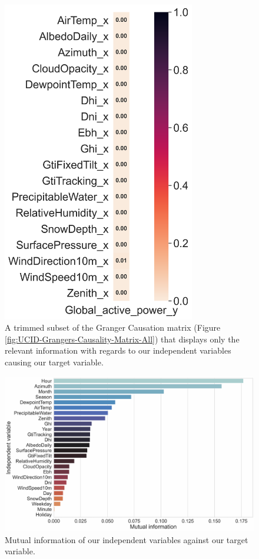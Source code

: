 \begin{figure}[hbt!]
    \centering
    \includegraphics[width=0.75\textwidth]{Images/Chapter 4/UCID/UCID-Grangers-Causality-Matrix-Single.png}
    \caption{A trimmed subset of the Granger Causation matrix (Figure \ref{fig:UCID-Grangers-Causality-Matrix-All}) that displays only the relevant information with regards to our independent variables causing our target variable.}
    \label{fig:UCID-Grangers-Causality-Matrix-Single}
\end{figure}

\begin{figure}[hbt!]
    \centering
    \includegraphics[width=\textwidth]{Images/Chapter 4/UCID/UCID-Mutual-Information.pdf}
    \caption{Mutual information of our independent variables against our target variable.}
    \label{fig:UCID-Mutual-Information-Gain}
\end{figure}

